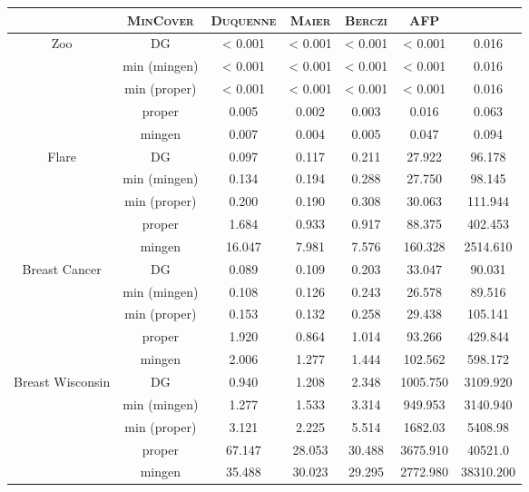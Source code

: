 \documentclass[runningheads]{llncs}
\DeclareMathOperator{\I}{\mathcal{L}}  %
\begin{document}
\begin{table}
	\centering
	\begin{tabular}{| c | c || c | c | c | c | c |}
		\hline \rowcolor{clouds}
		\multicolumn{2}{c}{$\I$} & \textsc{MinCover} & \textsc{Duquenne} & \textsc{Maier} & \textsc{Berczi} & \textsc{AFP} \\ \hline
		
		\multirow{5}{*}{Zoo}
		& DG           & < 0.001 & < 0.001 & < 0.001 & < 0.001 & 0.016 \\
		& min (mingen) & < 0.001 & < 0.001 & < 0.001 & < 0.001 & 0.016 \\
		& min (proper) & < 0.001 & < 0.001 & < 0.001 & < 0.001 & 0.016 \\
		& proper       & 0.005   & 0.002   & 0.003   & 0.016   & 0.063 \\
		& mingen       & 0.007   & 0.004   & 0.005   & 0.047   & 0.094 \\ \hline
		
		\multirow{5}{*}{Flare}
		& DG           & 0.097 & 0.117 & 0.211 & 27.922 & 96.178 \\
		& min (mingen) & 0.134 & 0.194 & 0.288 & 27.750 & 98.145 \\
		& min (proper) & 0.200 & 0.190 & 0.308 & 30.063 & 111.944 \\
		& proper       & 1.684 & 0.933 & 0.917 & 88.375 & 402.453 \\
		& mingen       & 16.047 & 7.981 & 7.576 & 160.328 & 2514.610 \\ \hline
		
		\multirow{5}{*}{Breast Cancer}
		& DG           & 0.089 & 0.109 & 0.203 & 33.047 & 90.031 \\
		& min (mingen) & 0.108 & 0.126 & 0.243 & 26.578 & 89.516 \\
		& min (proper) & 0.153 & 0.132 & 0.258 & 29.438 & 105.141 \\
		& proper       & 1.920 & 0.864 & 1.014 & 93.266 & 429.844 \\
		& mingen       & 2.006 & 1.277 & 1.444 & 102.562 & 598.172 \\ \hline
		
		\multirow{5}{*}{Breast Wisconsin} 
		& DG           & 0.940 & 1.208 & 2.348 & 1005.750 & 3109.920 \\
		& min (mingen) & 1.277 & 1.533 & 3.314 & 949.953 & 3140.940 \\
		& min (proper) & 3.121 & 2.225 & 5.514 & 1682.03 & 5408.98 \\
		& proper       & 67.147 & 28.053 & 30.488 & 3675.910 & 40521.0 \\
		& mingen       & 35.488 & 30.023 & 29.295 & 2772.980 & 38310.200 \\ \hline
		

\end{tabular}
\end{table}
\end{document}
